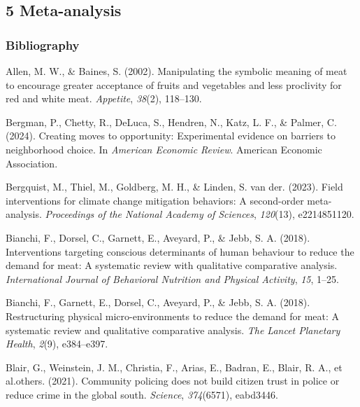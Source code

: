 \documentclass[
  man]{apa6}
\newlength{\cslhangindent}
\newenvironment{CSLReferences}[2] %
 {\begin{list}{}{%
  \setlength{\itemindent}{0pt}
  \setlength{\leftmargin}{0pt}
  \setlength{\parsep}{0pt}
  \ifodd #1
   \setlength{\leftmargin}{\cslhangindent}
   \setlength{\itemindent}{-1\cslhangindent}
  \fi
  \setlength{\itemsep}{#2\baselineskip}}}
 {\end{list}}
\begin{document}
\subsection{5 Meta-analysis}\label{meta-analysis}

\subsubsection*{Bibliography}\label{bibliography}

\label{refs}
\begin{CSLReferences}{1}{0}
Allen, M. W., \& Baines, S. (2002). Manipulating the symbolic meaning of meat to encourage greater acceptance of fruits and vegetables and less proclivity for red and white meat. \emph{Appetite}, \emph{38}(2), 118--130.

Bergman, P., Chetty, R., DeLuca, S., Hendren, N., Katz, L. F., \& Palmer, C. (2024). Creating moves to opportunity: Experimental evidence on barriers to neighborhood choice. In \emph{American Economic Review}. American Economic Association.

Bergquist, M., Thiel, M., Goldberg, M. H., \& Linden, S. van der. (2023). Field interventions for climate change mitigation behaviors: A second-order meta-analysis. \emph{Proceedings of the National Academy of Sciences}, \emph{120}(13), e2214851120.

Bianchi, F., Dorsel, C., Garnett, E., Aveyard, P., \& Jebb, S. A. (2018). Interventions targeting conscious determinants of human behaviour to reduce the demand for meat: A systematic review with qualitative comparative analysis. \emph{International Journal of Behavioral Nutrition and Physical Activity}, \emph{15}, 1--25.

Bianchi, F., Garnett, E., Dorsel, C., Aveyard, P., \& Jebb, S. A. (2018). Restructuring physical micro-environments to reduce the demand for meat: A systematic review and qualitative comparative analysis. \emph{The Lancet Planetary Health}, \emph{2}(9), e384--e397.

Blair, G., Weinstein, J. M., Christia, F., Arias, E., Badran, E., Blair, R. A., et al.others. (2021). Community policing does not build citizen trust in police or reduce crime in the global south. \emph{Science}, \emph{374}(6571), eabd3446.


\end{CSLReferences}
\end{document}
